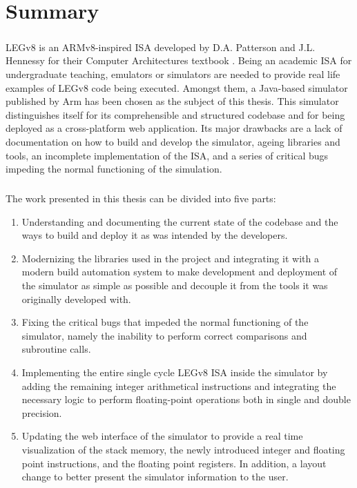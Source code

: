 \chapter{Summary}\label{chap:summ}
\paragraph{}
LEGv8 is an ARMv8-inspired ISA developed by D.A. Patterson and J.L. Hennessy for their Computer Architectures textbook \cite{patterson2016computer}. Being an academic ISA for undergraduate teaching, emulators or simulators are needed to provide real life examples of LEGv8 code being executed.
Amongst them, a Java-based simulator \cite{legv8simARMrepo} published by Arm \cite{armweb} has been chosen as the subject of this thesis. This simulator distinguishes itself for its comprehensible and structured codebase and for being deployed as a cross-platform web application. Its major drawbacks are a lack of documentation on how to build and develop the simulator, ageing libraries and tools, an incomplete implementation of the ISA, and a series of critical bugs impeding the normal functioning of the simulation.

\paragraph{}
The work presented in this thesis can be divided into five parts:

\begin{enumerate}
    \item Understanding and documenting the current state of the codebase and the ways to build and deploy it as was intended by the developers.
    \item Modernizing the libraries used in the project and integrating it with a modern build automation system \cite{mavenweb} to make development and deployment of the simulator as simple as possible and decouple it from the tools it was originally developed with.
    \item Fixing the critical bugs that impeded the normal functioning of the simulator, namely the inability to perform correct comparisons and subroutine calls.
    \item Implementing the entire single cycle LEGv8 ISA inside the simulator by adding the remaining integer arithmetical instructions and integrating the necessary logic to perform floating-point operations both in single and double precision.
    \item Updating the web interface of the simulator to provide a real time visualization of the stack memory, the newly introduced integer and floating point instructions, and the floating point registers. In addition, a layout change to better present the simulator information to the user.
\end{enumerate}


